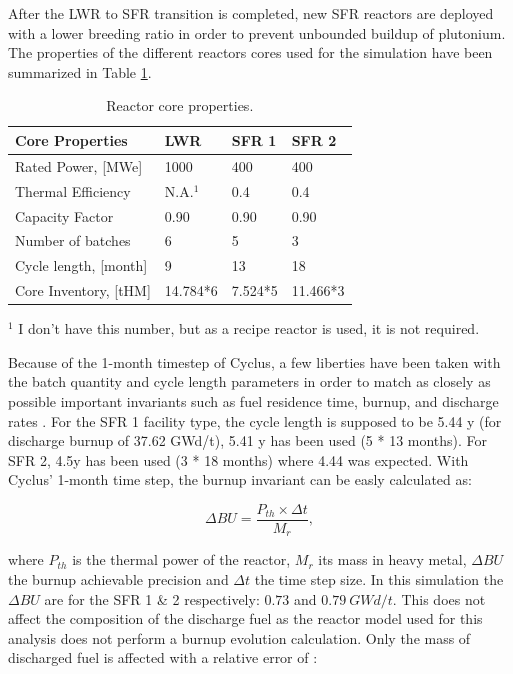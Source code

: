 \documentclass[12pt]{article}
\begin{document}
After the LWR to SFR transition is completed, new SFR reactors are deployed
with a lower breeding ratio in order to prevent unbounded buildup of
plutonium. The properties of the different reactors cores used for the
simulation have been summarized in Table \ref{tab:reactor}.

\begin{table}[h!]
    \centering
    \begin{tabularx}{350pt}{lXXX}
    \hline
    Core Properties       &	LWR     &	SFR 1   &	SFR 2     \\
    \hline
    Rated Power, [MWe]    &	1000		&	400     &	400       \\
    Thermal Efficiency    &	N.A.$^1$	&	0.4     &	0.4       \\
    Capacity Factor       &	0.90		&	0.90		&	0.90      \\
    Number of batches     &	6       &	5       &	3         \\
    Cycle length, [month] &	9       &	13      &	18        \\
    Core Inventory, [tHM] &	14.784*6&	7.524*5	&	11.466*3  \\
    \hline
    \end{tabularx}
    \caption{Reactor core properties.}
    \label{tab:reactor}
    \footnotesize{$^1$ I don't have this number, but as a recipe reactor is used, it is not required.}
\end{table}

Because of the 1-month timestep of Cyclus, a few liberties have been taken
with the batch quantity and cycle length parameters in order to match as
closely as possible important invariants such as fuel residence time, burnup,
and discharge rates \cite{B.Feng_calculation}.  For the SFR 1 facility type, the cycle
length is supposed to be 5.44 y (for discharge burnup of 37.62 GWd/t), 5.41 y
has been used (5 * 13 months). For SFR 2, 4.5y has been used (3 * 18 months)
where 4.44 was expected.  With Cyclus' 1-month time step, the burnup invariant
can be easly calculated as:

\begin{equation}
  \Delta BU = \frac{P_{th} \times \Delta t}{M_{r}},
\end{equation}

\noindent where $P_{th}$ is the thermal power of the reactor, $M_{r}$ its mass
in heavy metal, $\Delta BU$ the burnup achievable precision and $\Delta t$ the
time step size.  In this simulation the $\Delta BU$ are for the SFR 1 \& 2
respectively: $0.73$ and $0.79~GWd/t$.  This does not affect the composition
of the discharge fuel as the reactor model used for this analysis does not
perform a burnup evolution calculation.  Only the mass of discharged fuel is
affected with a relative error of :
\end{document}
